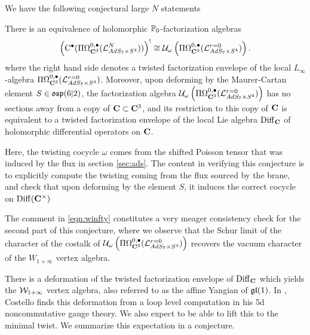 \parsec[]

We have the following conjectural large $N$ statements

\begin{conj}\label{conj:classical}
There is an equivalence of holomorphic $\mathbb{P}_0$-factorization algebras \[ \left( {\rm C}^\bullet (\Pi\Omega^{0,\bullet}_{\mathbf{C}^3} (\mathcal{L}^N_{AdS_7\times S^4}))\right)^!\cong \mathcal{U}_{\omega} \left ( \Pi\Omega^{0,\bullet}_{\mathbf{C}^3} (\mathcal{L}^{r=0}_{AdS_7\times S^4} )\right ).\] where the right hand side denotes a twisted factorization envelope of the local $L_\infty$-algebra $\Pi\Omega^{0,\bullet}_{\mathbf{C}^3} (\mathcal{L}^{r=0}_{AdS_7\times S^4} )$. Moreover, upon deforming by the Maurer-Cartan element $S\in \mathfrak{osp}(6|2)$, the factorization algebra $\mathcal{U}_{\omega} \left ( \Pi\Omega^{0,\bullet}_{\mathbf{C}^3} (\mathcal{L}^{r=0}_{AdS_7\times S^4} )\right )$ has no sections away from a copy of $\mathbf{C}\subset \mathbf{C}^3$, and its restriction to this copy of $\mathbf{C}$ is equivalent to a twisted factorization envelope of the local Lie algebra $\operatorname {Diff}_{\mathbf{C}}$ of holomorphic differential operators on $\mathbf{C}$. 
\end{conj}

Here, the twisting cocycle $\omega$ comes from the shifted Poisson tensor that was induced by the flux in section \ref{sec:ads}. The content in verifying this conjecture is to explicitly compute the twisting coming from the flux sourced by the brane, and check that upon deforming by the element $S$, it induces the correct cocycle on $\operatorname{Diff}(\mathbf{C}^\times)$

The comment in \ref{eqn:winfty} constitutes a very meager consistency check for the second part of this conjecture, where we observe that the Schur limit of the character of the costalk of $\mathcal{U}_{\omega} \left ( \Pi\Omega^{0,\bullet}_{\mathbf{C}^3} (\mathcal{L}^{r=0}_{AdS_7\times S^4} ) \right)$ recovers the vacuum character of the $W_{1+\infty}$ vertex algebra.

There is a deformation of the twisted factorization envelope of $\operatorname{Diff}_{\mathbf{C}}$ which yields the $\mathcal{W}_{1+\infty}$ vertex algebra, also referred to as the affine Yangian of $\mathfrak{gl}(1)$. In \cite{CostelloM5}, Costello finds this deformation from a loop level computation in his 5d noncommutative gauge theory. We also expect to be able to lift this to the minimal twist. We summarize this expectation in a conjecture. 

